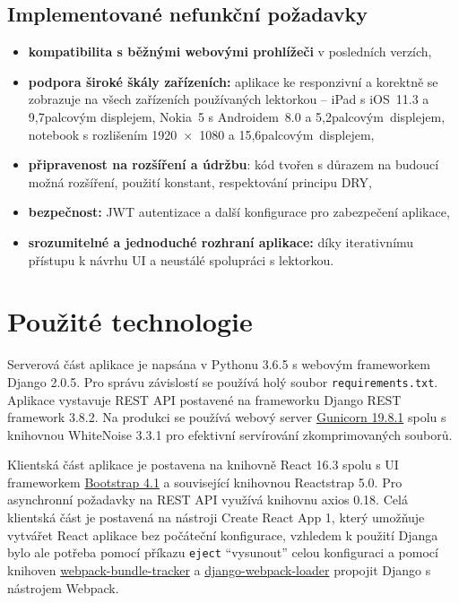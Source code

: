 \subsection{Implementované nefunkční požadavky}
\begin{itemize}
    \item \textbf{kompatibilita s běžnými webovými prohlížeči} v posledních verzích,
    \item \textbf{podpora široké škály zařízeních:} aplikace ke responzivní a korektně se zobrazuje na všech zařízeních používaných lektorkou -- iPad s iOS~11.3 a 9,7palcovým displejem, Nokia~5 s Androidem~8.0 a 5,2palcovým~displejem, notebook s rozlišením 1920~×~1080 a 15,6palcovým~displejem,
    \item \textbf{připravenost na rozšíření a údržbu}: kód tvořen s důrazem na budoucí možná rozšíření, použití konstant, respektování principu DRY,
    \item \textbf{bezpečnost:} JWT autentizace a další konfigurace pro zabezpečení aplikace,
    \item \textbf{srozumitelné a jednoduché rozhraní aplikace:} díky iterativnímu přístupu k návrhu UI a neustálé spolupráci s lektorkou.
\end{itemize}

\section{Použité technologie}
Serverová část aplikace je napsána v Pythonu 3.6.5 s webovým frameworkem Django 2.0.5. Pro správu závislostí se používá holý soubor \verb|requirements.txt|. Aplikace vystavuje REST API postavené na frameworku Django REST framework 3.8.2. Na produkci se používá webový server \href{http://gunicorn.org/}{Gunicorn 19.8.1} spolu s knihovnou WhiteNoise 3.3.1 pro efektivní servírování zkomprimovaných souborů.

Klientská část aplikace je postavena na knihovně React 16.3 spolu s UI frameworkem \href{https://getbootstrap.com}{Bootstrap 4.1} a související knihovnou Reactstrap 5.0. Pro asynchronní požadavky na REST API využívá knihovnu axios 0.18. Celá klientská část je postavená na nástroji Create React App 1, který umožňuje \cite{cra} vytvářet React aplikace bez počáteční konfigurace, vzhledem k použití Djanga bylo ale potřeba \cite{bp} pomocí příkazu \verb|eject| \enquote{vysunout} celou konfiguraci a pomocí knihoven \href{https://github.com/owais/webpack-bundle-tracker}{webpack-bundle-tracker} a  \href{https://github.com/owais/django-webpack-loader}{django-webpack-loader} propojit Django s nástrojem Webpack.


